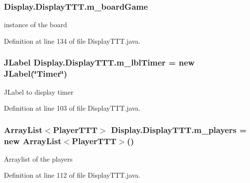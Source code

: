 \subsubsection[{m\+\_\+board\+Game}]{ Display.\+Display\+T\+T\+T.\+m\+\_\+board\+Game\hspace{0.3cm}{\ttfamily [private]}}\label{class_display_1_1_display_t_t_t_a3f540c3d30082e201fcb37c9623d6d27}
instance of the board 

Definition at line 134 of file Display\+T\+T\+T.\+java.

\hypertarget{class_display_1_1_display_t_t_t_a42c7a03ac93841369bd7e73460b59e11}{}
\subsubsection[{m\+\_\+lbl\+Timer}]{\setlength{\rightskip}{0pt plus 5cm}J\+Label Display.\+Display\+T\+T\+T.\+m\+\_\+lbl\+Timer = new J\+Label(\char`\"{}Timer\char`\"{})\hspace{0.3cm}{\ttfamily [private]}}\label{class_display_1_1_display_t_t_t_a42c7a03ac93841369bd7e73460b59e11}
J\+Label to display timer 

Definition at line 103 of file Display\+T\+T\+T.\+java.

\hypertarget{class_display_1_1_display_t_t_t_ad3a0687ab98eb4f191cd30a64ef60304}{}
\subsubsection[{m\+\_\+players}]{\setlength{\rightskip}{0pt plus 5cm}Array\+List$<${\bf Player\+T\+T\+T}$>$ Display.\+Display\+T\+T\+T.\+m\+\_\+players = new Array\+List$<${\bf Player\+T\+T\+T}$>$()\hspace{0.3cm}{\ttfamily [private]}}\label{class_display_1_1_display_t_t_t_ad3a0687ab98eb4f191cd30a64ef60304}
Arraylist of the players 

Definition at line 112 of file Display\+T\+T\+T.\+java.

\hypertarget{class_display_1_1_display_t_t_t_afbd113d4a9cd8573238108344561f62c}{}
